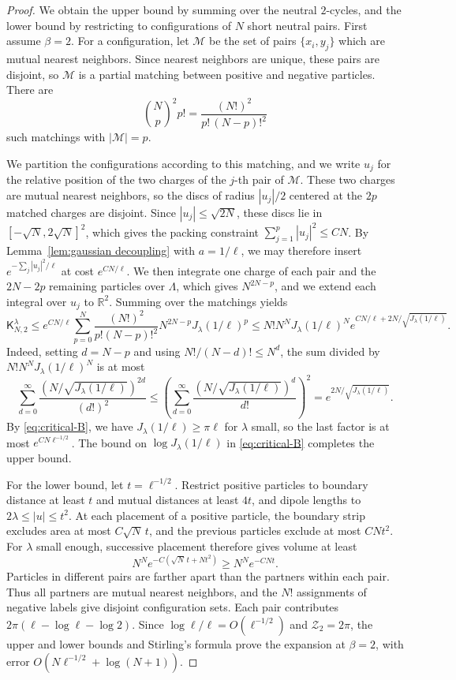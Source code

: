 \documentclass[a4paper,10pt,leqno]{amsart}
\numberwithin{equation}{section}
\newcommand{\R}{\mathbb{R}}
\def\mc{\mathcal}
\def\K{\mathsf{K}}
\begin{document}
\begin{proof}
  We obtain the upper bound by summing over the neutral $2$-cycles, and the lower bound by restricting to configurations of $N$ short neutral pairs. First assume $\beta=2$.
  For a configuration, let $\mc M$ be the set of pairs $\{x_i,y_j\}$ which are mutual nearest neighbors. Since nearest neighbors are unique, these pairs are disjoint, so $\mc M$ is a partial matching between positive and negative particles. There are
\[
  \binom{N}{p}^2p!=\frac{(N!)^2}{p!\,(N-p)!^2}
\]
such matchings with $|\mc M|=p$.

  We partition the configurations according to this matching, and we write $u_j$ for the relative position of the two charges of the $j$-th pair of $\mc M$. These two charges are mutual nearest neighbors, so the discs of radius $|u_j|/2$ centered at the $2p$ matched charges are disjoint. Since $|u_j|\le\sqrt{2N}$, these discs lie in $[-\sqrt N,2\sqrt N]^2$, which gives the packing constraint $\sum_{j=1}^p|u_j|^2\le CN$. By Lemma~\ref{lem:gaussian decoupling} with $a=1/\ell$, we may therefore insert $e^{-\sum_j|u_j|^2/\ell}$ at cost $e^{CN/\ell}$. We then integrate one charge of each pair and the $2N-2p$ remaining particles over $\Lambda$, which gives $N^{2N-p}$, and we extend each integral over $u_j$ to $\R^2$. Summing over the matchings yields
  \begin{equation*}
    \K_{N,2}^\lambda\le e^{CN/\ell}\sum_{p=0}^N
    \frac{(N!)^2}{p!(N-p)!^2}N^{2N-p}{J_\lambda(1/\ell)}^p
    \le N!N^N{J_\lambda(1/\ell)}^N e^{CN/\ell+2N/\sqrt{J_\lambda(1/\ell)}}.
  \end{equation*}
  Indeed, setting $d=N-p$ and using $N!/(N-d)!\le N^d$, the sum divided by $N!N^N{J_\lambda(1/\ell)}^N$ is at most
  \[
    \sum_{d=0}^{\infty}\frac{(N/\sqrt{J_\lambda(1/\ell)})^{2d}}{(d!)^2}
    \le\left(\sum_{d=0}^{\infty}\frac{(N/\sqrt{J_\lambda(1/\ell)})^d}{d!}\right)^2
    =e^{2N/\sqrt{J_\lambda(1/\ell)}}.
  \]
  By \eqref{eq:critical-B}, we have $J_\lambda(1/\ell)\ge\pi\ell$ for $\lambda$ small, so the last factor is at most $e^{CN\ell^{-1/2}}$. The bound on $\log J_\lambda(1/\ell)$ in \eqref{eq:critical-B} completes the upper bound.

  For the lower bound, let $t=\ell^{-1/2}$. Restrict positive particles to boundary distance at least $t$ and mutual distances at least $4t$, and dipole lengths to $2\lambda\le|u|\le t^2$. At each placement of a positive particle, the boundary strip excludes area at most $C\sqrt N\,t$, and the previous particles exclude at most $CNt^2$. For $\lambda$ small enough, successive placement therefore gives volume at least
  \[
    N^N e^{-C(\sqrt N\,t+Nt^2)}\ge N^Ne^{-CNt}.
  \]
  Particles in different pairs are farther apart than the partners within each pair. Thus all partners are mutual nearest neighbors, and the $N!$ assignments of negative labels give disjoint configuration sets. Each pair contributes $2\pi(\ell-\log\ell-\log2)$. Since $\log\ell/\ell=O(\ell^{-1/2})$ and $\mc Z_2=2\pi$, the upper and lower bounds and Stirling's formula prove the expansion at $\beta=2$, with error $O(N\ell^{-1/2}+\log(N+1))$.


\end{proof}
\end{document}
